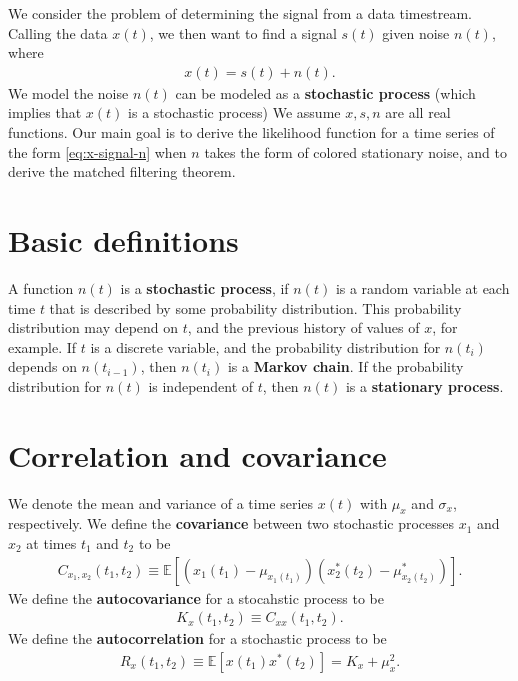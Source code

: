 We consider the problem of determining the signal from a data timestream.
Calling the data $x(t)$, we then want to find a signal $s(t)$ given noise
$n(t)$, where
\begin{align}
    \label{eq:x-signal-n}
    x\left(t\right) = s\left(t\right) + n\left(t\right)
    .
\end{align}
We model the noise $n(t)$ can be modeled as a \textbf{stochastic process}
(which implies that $x(t)$ is a stochastic process)
We assume $x,s,n$ are all real functions.
Our main goal is to derive the likelihood function for a time series of the form
\eqref{eq:x-signal-n} when $n$ takes the form of colored stationary noise, and
to derive the matched filtering theorem.

\section{Basic definitions}

A function $n(t)$ is a \textbf{stochastic process}, 
if $n(t)$ is a random variable at each time $t$ that is described by some probability distribution.
This probability distribution may depend on $t$, and the previous history of values of $x$, for example.
If $t$ is a discrete variable, and the probability distribution for $n(t_i)$ depends on
$n(t_{i-1})$, then $n(t_i)$ is a \textbf{Markov chain}.
If the probability distribution for $n(t)$ is independent of $t$, then $n(t)$
is a \textbf{stationary process}.

\section{Correlation and covariance}

We denote the mean and variance of a time series $x(t)$ with $\mu_x$ and $\sigma_x$, respectively. 
We define the \textbf{covariance} between two stochastic processes $x_1$ and $x_2$ at times $t_1$ and $t_2$ to be 
\begin{align}
    C_{x_1,x_2}\left(t_1,t_2\right)
    \equiv
    \mathbb{E}\left[
        \left(x_1\left(t_1\right) - \mu_{x_1\left(t_1\right)}\right)
        \left(x^*_2\left(t_2\right) - \mu^*_{x_2\left(t_2\right)}\right)
    \right]
    .
\end{align}
We define the \textbf{autocovariance} for a stocahstic process to be 
\begin{align}
    K_{x}\left(t_1,t_2\right)
    \equiv
    C_{xx}\left(t_1,t_2\right)
    .
\end{align}
We define the \textbf{autocorrelation} for a stochastic process to be
\begin{align}
    R_{x}\left(t_1,t_2\right)
    \equiv
    \mathbb{E}\left[x\left(t_1\right)x^*\left(t_2\right)\right]
    =
    K_{x} + \mu_x^2
    .
\end{align}

